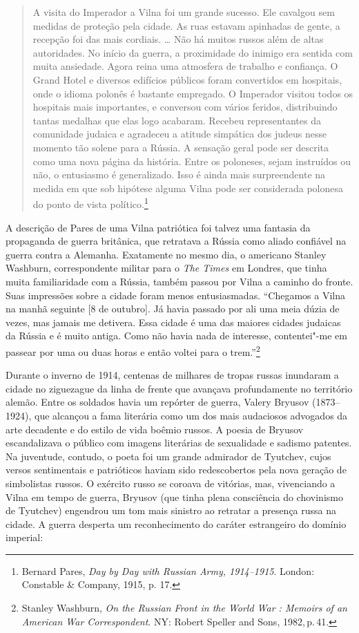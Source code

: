 \begin{quote}
A visita do Imperador a Vilna foi um grande sucesso. Ele cavalgou sem
medidas de proteção pela cidade. As ruas estavam apinhadas de gente, a
recepção foi das mais cordiais. \ldots{} Não há muitos russos além de
altas autoridades. No início da guerra, a proximidade do inimigo era
sentida com muita ansiedade. Agora reina uma atmosfera de trabalho e
confiança. O Grand Hotel e diversos edifícios públicos foram convertidos
em hospitais, onde o idioma polonês é bastante empregado. O Imperador
visitou todos os hospitais mais importantes, e conversou com vários
feridos, distribuindo tantas medalhas que elas logo acabaram. Recebeu
representantes da comunidade judaica e agradeceu a atitude simpática dos
judeus nesse momento tão solene para a Rússia. A sensação geral pode ser
descrita como uma nova página da história. Entre os poloneses, sejam
instruídos ou não, o entusiasmo é generalizado. Isso é ainda mais
surpreendente na medida em que sob hipótese alguma Vilna pode ser
considerada polonesa do ponto de vista político.\footnote{Bernard Pares,
  \emph{Day by Day with Russian Army, 1914--1915}. London: Constable \&
  Company, 1915, p. 17.}
\end{quote}

A descrição de Pares de uma Vilna patriótica foi talvez uma fantasia da
propaganda de guerra britânica, que retratava a Rússia como aliado
confiável na guerra contra a Alemanha. Exatamente no mesmo dia, o
americano Stanley Washburn, correspondente militar para o \emph{The
Times} em Londres, que tinha muita familiaridade com a Rússia, também
passou por Vilna a caminho do fronte. Suas impressões sobre a cidade
foram menos entusiasmadas. ``Chegamos a Vilna na manhã seguinte {[}8 de
outubro{]}. Já havia passado por ali uma meia dúzia de vezes, mas jamais
me detivera. Essa cidade é uma das maiores cidades judaicas da Rússia e
é muito antiga. Como não havia nada de interesse, contentei"-me em
passear por uma ou duas horas e então voltei para o trem.''\footnote{Stanley
  Washburn, \emph{On the Russian Front in the World War : Memoirs of an
  American War Correspondent}. NY: Robert Speller and Sons, 1982,\,p.\,41.} %

Durante o inverno de 1914, centenas de milhares de tropas russas
inundaram a cidade no ziguezague da linha de frente que avançava
profundamente no território alemão. Entre os soldados havia um repórter
de guerra, Valery Bryusov (1873--1924), que alcançou a fama literária
como um dos mais audaciosos advogados da arte decadente e do estilo de
vida boêmio russos. A poesia de Bryusov escandalizava o público com
imagens literárias de sexualidade e sadismo patentes. Na juventude,
contudo, o poeta foi um grande admirador de Tyutchev, cujos versos
sentimentais e patrióticos haviam sido redescobertos pela nova geração
de simbolistas russos. O exército russo se coroava de vitórias, mas,
vivenciando a Vilna em tempo de guerra, Bryusov (que tinha plena
consciência do chovinismo de Tyutchev) engendrou um tom mais sinistro ao
retratar a presença russa na cidade. A guerra desperta um reconhecimento
do caráter estrangeiro do domínio imperial:

